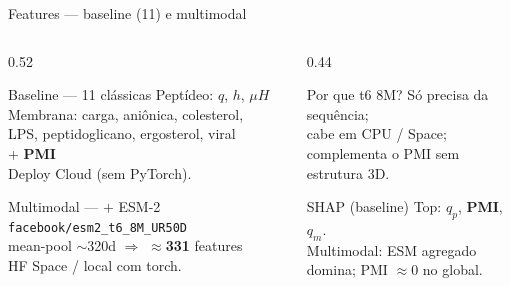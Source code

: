 \documentclass[aspectratio=169,10pt]{beamer}
\begin{document}
\begin{frame}{Features --- baseline (11) e multimodal}
\begin{columns}[T]
\begin{column}{0.52\textwidth}
\begin{block}{Baseline --- 11 clássicas}
Peptídeo: $q$, $h$, $\mu H$\\
Membrana: carga, aniônica, colesterol,\\
LPS, peptidoglicano, ergosterol, viral\\
+ \textbf{PMI}\\[0.1cm]
{\scriptsize Deploy Cloud (sem PyTorch).}
\end{block}
\vspace{0.2cm}
\begin{block}{Multimodal --- $+$ ESM-2}
\texttt{facebook/esm2\_t6\_8M\_UR50D}\\
mean-pool $\sim$320d $\Rightarrow$ $\approx$\textbf{331} features\\
{\scriptsize HF Space / local com torch.}
\end{block}
\end{column}
\begin{column}{0.44\textwidth}
\begin{block}{Por que t6 8M?}
Só precisa da sequência;\\
cabe em CPU / Space;\\
complementa o PMI sem\\
estrutura 3D.
\end{block}
\vspace{0.2cm}
\begin{block}{SHAP (baseline)}
Top: $q_p$, \textbf{PMI}, $q_m$.\\
{\scriptsize Multimodal: ESM agregado\\
domina; PMI $\approx 0$ no global.}
\end{block}
\end{column}
\end{columns}
\end{frame}
\end{document}
